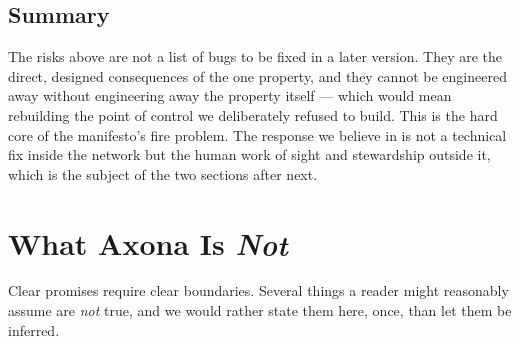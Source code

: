 \documentclass[nobib,justified]{tufte-handout}
\begin{document}
\subsection{Summary}

The risks above are not a list of bugs to be fixed in a later version. They are
the direct, designed consequences of the one property, and they cannot be
engineered away without engineering away the property itself --- which would mean
rebuilding the point of control we deliberately refused to build. This is the
hard core of the manifesto's fire problem. The response we believe in is not a
technical fix inside the network but the human work of sight and stewardship
outside it, which is the subject of the two sections after next.

\section{What Axona Is \emph{Not}}

Clear promises require clear boundaries. Several things a reader might reasonably
assume are \emph{not} true, and we would rather state them here, once, than let
them be inferred.
\end{document}
